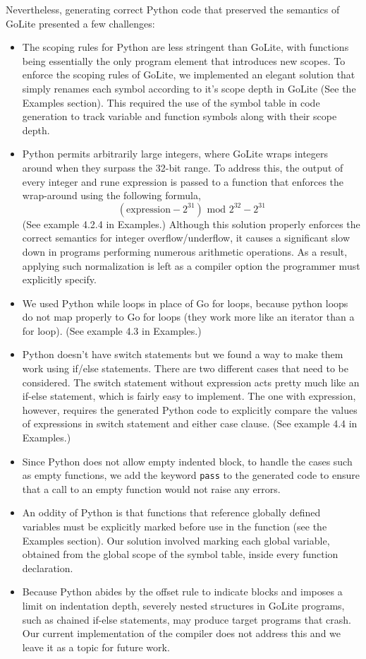 \documentclass{article}
\begin{document}
Nevertheless, generating correct Python code that preserved the semantics of GoLite presented a few challenges:
\begin{itemize}
\item The scoping rules for Python are less stringent than GoLite, with functions being essentially the only program element that introduces new scopes. To enforce the scoping rules of GoLite, we implemented an elegant solution that simply renames each symbol according to it's scope depth in GoLite (See the Examples section). This required the use of the symbol table in code generation to track variable and function symbols along with their scope depth.
\item Python permits arbitrarily large integers, where GoLite wraps integers around when they surpass the 32-bit range. To address this, the output of every integer and rune expression is passed to a function that enforces the wrap-around using the following formula,
\begin{equation}
(\mbox{expression} - 2^{31}) \mbox{ mod } 2^{32} - 2^{31}
\end{equation}
(See example 4.2.4 in Examples.) Although this solution properly enforces the correct semantics for integer overflow/underflow, it causes a significant slow down in programs performing numerous arithmetic operations. As a result, applying such normalization is left as a compiler option the programmer must explicitly specify.
\item We used Python while loops in place of Go for loops, because python loops do not map properly to Go for loops (they work more like an iterator than a for loop). (See example 4.3 in Examples.)
\item Python doesn't have switch statements but we found a way to make them work using if/else statements. There are two different cases that need to be considered. The switch statement without expression acts pretty much like an if-else statement, which is fairly easy to implement. The one with expression, however, requires the generated Python code to explicitly compare the values of expressions in switch statement and either case clause. (See example 4.4 in Examples.)
\item Since Python does not allow empty indented block, to handle the cases such as empty functions, we add the keyword \texttt{pass} to the generated code to ensure that a call to an empty function would not raise any errors.
\item An oddity of Python is that functions that reference globally defined variables must be explicitly marked before use in the function (see the Examples section). Our solution involved marking each global variable, obtained from the global scope of the symbol table, inside every function declaration.
\item Because Python abides by the offset rule to indicate blocks and imposes a limit on indentation depth, severely nested structures in GoLite programs, such as chained if-else statements, may produce target programs that crash. Our current implementation of the compiler does not address this and we leave it as a topic for future work.
\end{itemize}
\end{document}
